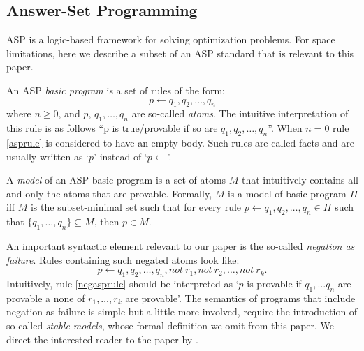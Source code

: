 \subsection{Answer-Set Programming}
ASP \cite{Lifschitz08} is a logic-based framework for solving optimization problems. For space limitations, here we describe a subset of an ASP standard that is relevant to this paper.

An ASP \emph{basic program} is a set of rules of the form:
\begin{equation}\label{asprule}
p\leftarrow q_1,q_2,\ldots,q_n
\end{equation}
where $n\geq 0$, and $p$, $q_1,\ldots,q_n$ are so-called \emph{atoms}. The intuitive interpretation of this rule is as follows ``p is true/provable if so are $q_1,q_2,\ldots,q_n$''. When $n=0$ rule \eqref{asprule} is considered to have an empty body. Such rules are called facts and are usually written as `$p$' instead of `$p\leftarrow $'.

A \emph{model} of an ASP basic program is a set of atoms $M$ that intuitively contains all and only the atoms that are provable. Formally, $M$ is a model of basic program $\Pi$ iff $M$ is the subset-minimal set such that for every rule $p\leftarrow q_1,q_2,\ldots,q_n \in \Pi$ such that $\{q_1,\ldots,q_n\}\subseteq M$, then $p\in M$.



An important syntactic element relevant to our paper is the so-called \emph{negation as failure}. Rules containing such negated atoms look like:
\begin{equation}\label{negasprule}
p\leftarrow q_1,q_2,\ldots,q_n, not\: r_1,not\: r_2, \ldots, not\: r_k .
\end{equation}
Intuitively, rule \eqref{negasprule} should be interpreted as `$p$ is provable if $q_1,\ldots q_n$ are provable a none of $r_1,\ldots,r_k$ are provable'. The semantics of programs that include negation as failure is simple but a little more involved, require the introduction of so-called \emph{stable models}, whose formal definition we omit from this paper. We direct the interested reader to the paper by .


